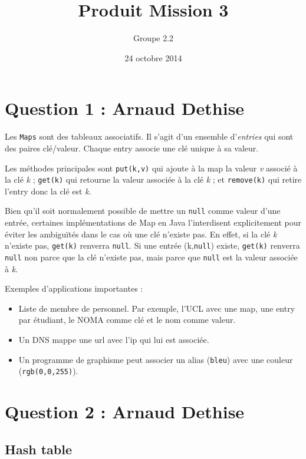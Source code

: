 \documentclass[10pt,a4paper]{article}
\date{24 octobre 2014}
\author{Groupe 2.2}
\title{Produit Mission 3}
\begin{document}
\maketitle

\section*{Question 1 : Arnaud Dethise}

	Les \texttt{Maps} sont des tableaux associatifs. Il s'agit d'un ensemble d'\textit{entries} qui sont des paires clé/valeur. Chaque entry associe une clé unique à sa valeur.

	Les méthodes principales sont \texttt{put(k,v)} qui ajoute à la map la valeur \textit{v} associé à la clé \textit{k} ; \texttt{get(k)} qui retourne la valeur associée à la clé \textit{k} ; et \texttt{remove(k)} qui retire l'entry donc la clé est \textit{k}.
	
	\vspace{0.35cm}

	Bien qu'il soit normalement possible de mettre un \texttt{null} comme valeur d'une entrée, certaines implémentations de Map en Java l'interdisent explicitement pour éviter les ambiguïtés dans le cas où une clé n'existe pas. En effet, si la clé \textit{k} n'existe pas, \texttt{get(k)} renverra \texttt{null}. Si une entrée (k,\texttt{null}) existe, \texttt{get(k)} renverra \texttt{null} non parce que la clé n'existe pas, mais parce que \texttt{null} est la valeur associée à \textit{k}.
	
	\vspace{0.35cm}
	
	Exemples d'applications importantes :
	\begin{itemize}
		\item Liste de membre de personnel. Par exemple, l'UCL avec une map, une entry par étudiant, le NOMA comme clé et le nom comme valeur.	
		\item Un DNS mappe une url avec l'ip qui lui est associée.
		\item Un programme de graphisme peut associer un alias (\texttt{bleu}) avec une couleur (\texttt{rgb(0,0,255)}).
	\end{itemize}

\section*{Question 2 : Arnaud Dethise}

	\subsection*{Hash table}
	
\end{document}
